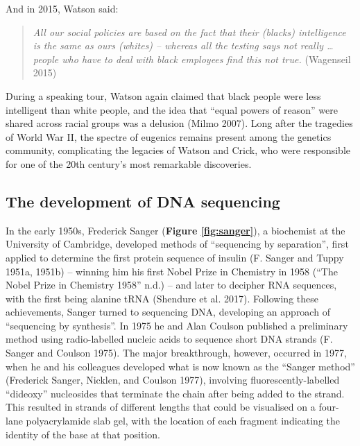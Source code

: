 \documentclass[
]{book}
\begin{document}
And in 2015, Watson said:

\begin{quote}
\emph{All our social policies are based on the fact that their (blacks) intelligence is the same as ours (whites) -- whereas all the testing says not really \ldots{} people who have to deal with black employees find this not true.} (Wagenseil 2015)
\end{quote}

During a speaking tour, Watson again claimed that black people were less intelligent than white people, and the idea that ``equal powers of reason'' were shared across racial groups was a delusion (Milmo 2007). Long after the tragedies of World War II, the spectre of eugenics remains present among the genetics community, complicating the legacies of Watson and Crick, who were responsible for one of the 20th century's most remarkable discoveries.

\hypertarget{the-development-of-dna-sequencing}{%
\subsection{The development of DNA sequencing}\label{the-development-of-dna-sequencing}}

In the early 1950s, Frederick Sanger (\textbf{Figure \ref{fig:sanger}}), a biochemist at the University of Cambridge, developed methods of ``sequencing by separation'', first applied to determine the first protein sequence of insulin (F. Sanger and Tuppy 1951a, 1951b) -- winning him his first Nobel Prize in Chemistry in 1958 ({``The {Nobel Prize} in {Chemistry} 1958''} n.d.) -- and later to decipher RNA sequences, with the first being alanine tRNA (Shendure et al. 2017). Following these achievements, Sanger turned to sequencing DNA, developing an approach of ``sequencing by synthesis''. In 1975 he and Alan Coulson published a preliminary method using radio-labelled nucleic acids to sequence short DNA strands (F. Sanger and Coulson 1975). The major breakthrough, however, occurred in 1977, when he and his colleagues developed what is now known as the ``Sanger method'' (Frederick Sanger, Nicklen, and Coulson 1977), involving fluorescently-labelled ``dideoxy'' nucleosides that terminate the chain after being added to the strand. This resulted in strands of different lengths that could be visualised on a four-lane polyacrylamide slab gel, with the location of each fragment indicating the identity of the base at that position.
\end{document}
